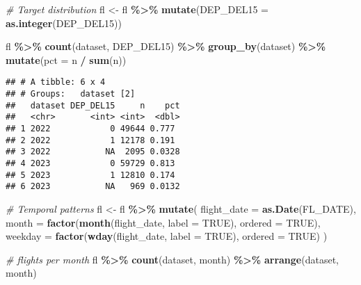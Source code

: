 \documentclass[
]{article}
\newenvironment{Shaded}{\begin{snugshade}}{\end{snugshade}}
\newcommand{\AttributeTok}[1]{\textcolor[rgb]{0.13,0.29,0.53}{#1}}
\newcommand{\CommentTok}[1]{\textcolor[rgb]{0.56,0.35,0.01}{\textit{#1}}}
\newcommand{\ConstantTok}[1]{\textcolor[rgb]{0.56,0.35,0.01}{#1}}
\newcommand{\FunctionTok}[1]{\textcolor[rgb]{0.13,0.29,0.53}{\textbf{#1}}}
\newcommand{\NormalTok}[1]{#1}
\newcommand{\OtherTok}[1]{\textcolor[rgb]{0.56,0.35,0.01}{#1}}
\newcommand{\SpecialCharTok}[1]{\textcolor[rgb]{0.81,0.36,0.00}{\textbf{#1}}}
\begin{document}
\begin{Shaded}
\begin{Highlighting}[]
\CommentTok{\# Target distribution}
\NormalTok{fl }\OtherTok{\textless{}{-}}\NormalTok{ fl }\SpecialCharTok{\%\textgreater{}\%}
  \FunctionTok{mutate}\NormalTok{(}\AttributeTok{DEP\_DEL15 =} \FunctionTok{as.integer}\NormalTok{(DEP\_DEL15))}

\NormalTok{fl }\SpecialCharTok{\%\textgreater{}\%}
  \FunctionTok{count}\NormalTok{(dataset, DEP\_DEL15) }\SpecialCharTok{\%\textgreater{}\%}
  \FunctionTok{group\_by}\NormalTok{(dataset) }\SpecialCharTok{\%\textgreater{}\%}
  \FunctionTok{mutate}\NormalTok{(}\AttributeTok{pct =}\NormalTok{ n }\SpecialCharTok{/} \FunctionTok{sum}\NormalTok{(n))}
\end{Highlighting}
\end{Shaded}

\begin{verbatim}
## # A tibble: 6 x 4
## # Groups:   dataset [2]
##   dataset DEP_DEL15     n    pct
##   <chr>       <int> <int>  <dbl>
## 1 2022            0 49644 0.777 
## 2 2022            1 12178 0.191 
## 3 2022           NA  2095 0.0328
## 4 2023            0 59729 0.813 
## 5 2023            1 12810 0.174 
## 6 2023           NA   969 0.0132
\end{verbatim}

\begin{Shaded}
\begin{Highlighting}[]
\CommentTok{\# Temporal patterns }
\NormalTok{fl }\OtherTok{\textless{}{-}}\NormalTok{ fl }\SpecialCharTok{\%\textgreater{}\%}
  \FunctionTok{mutate}\NormalTok{(}
    \AttributeTok{flight\_date =} \FunctionTok{as.Date}\NormalTok{(FL\_DATE),}
    \AttributeTok{month       =} \FunctionTok{factor}\NormalTok{(}\FunctionTok{month}\NormalTok{(flight\_date, }\AttributeTok{label =} \ConstantTok{TRUE}\NormalTok{), }\AttributeTok{ordered =} \ConstantTok{TRUE}\NormalTok{),}
    \AttributeTok{weekday     =} \FunctionTok{factor}\NormalTok{(}\FunctionTok{wday}\NormalTok{(flight\_date, }\AttributeTok{label =} \ConstantTok{TRUE}\NormalTok{), }\AttributeTok{ordered =} \ConstantTok{TRUE}\NormalTok{)}
\NormalTok{  )}

\CommentTok{\# flights per month}
\NormalTok{fl }\SpecialCharTok{\%\textgreater{}\%} \FunctionTok{count}\NormalTok{(dataset, month) }\SpecialCharTok{\%\textgreater{}\%} \FunctionTok{arrange}\NormalTok{(dataset, month)}
\end{Highlighting}
\end{Shaded}
\end{document}
